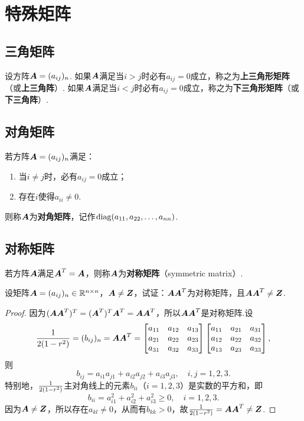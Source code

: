 \section{特殊矩阵}
\subsection{三角矩阵}
\begin{definition}
设方阵\(\boldsymbol{A}=(a_{ij})_n\).
如果\(\boldsymbol{A}\)满足当\(i>j\)时必有\(a_{ij} = 0\)成立，称之为\textbf{上三角形矩阵}（或\textbf{上三角阵}）.
如果\(\boldsymbol{A}\)满足当\(i<j\)时必有\(a_{ij} = 0\)成立，称之为\textbf{下三角形矩阵}（或\textbf{下三角阵}）.
\end{definition}

\subsection{对角矩阵}
\begin{definition}
若方阵\(\boldsymbol{A}=(a_{ij})_n\)满足：
\begin{enumerate}
\item 当\(i \neq j\)时，必有\(a_{ij} = 0\)成立；
\item 存在\(i\)使得\(a_{ii} \neq 0\).
\end{enumerate}
则称\(\boldsymbol{A}\)为\textbf{对角矩阵}，记作\(\operatorname{diag}(a_{11},a_{22},\dotsc,a_{nn})\).
\end{definition}

\subsection{对称矩阵}
\begin{definition}
若方阵\(\boldsymbol{A}\)满足\(\boldsymbol{A}^T = \boldsymbol{A}\)，则称\(\boldsymbol{A}\)为\textbf{对称矩阵}（symmetric matrix）.
\end{definition}

\begin{example}
设矩阵\(\boldsymbol{A} = (a_{ij})_n \in \mathbb{R}^{n \times n}\)，\(\boldsymbol{A} \neq \boldsymbol{Z}\)，试证：\(\boldsymbol{A} \boldsymbol{A}^T\)为对称矩阵，且\(\boldsymbol{A} \boldsymbol{A}^T \neq \boldsymbol{Z}\).
\begin{proof}
因为\((\boldsymbol{A} \boldsymbol{A}^T)^T = (\boldsymbol{A}^T)^T \boldsymbol{A}^T = \boldsymbol{A} \boldsymbol{A}^T\)，所以\(\boldsymbol{A} \boldsymbol{A}^T\)是对称矩阵.设\[
\frac{1}{2(1-r^2)} = (b_{ij})_n = \boldsymbol{A} \boldsymbol{A}^T = \begin{bmatrix}
a_{11} & a_{12} & a_{13} \\
a_{21} & a_{22} & a_{23} \\
a_{31} & a_{32} & a_{33} \\
\end{bmatrix} \begin{bmatrix}
a_{11} & a_{21} & a_{31} \\
a_{12} & a_{22} & a_{32} \\
a_{13} & a_{23} & a_{33} \\
\end{bmatrix},
\]则\[
b_{ij} = a_{i1} a_{j1} + a_{i2} a_{j2} + a_{i3} a_{j3},
\quad i,j=1,2,3.
\]特别地，\(\frac{1}{2(1-r^2)}\)主对角线上的元素\(b_{ii}\)（\(i=1,2,3\)）是实数的平方和，即\[
b_{ii} = a_{i1}^2 + a_{i2}^2 + a_{i3}^2 \geqslant 0,
\quad i=1,2,3.
\]因为\(\boldsymbol{A} \neq \boldsymbol{Z}\)，所以存在\(a_{kl} \neq 0\)，从而有\(b_{kk} > 0\)，故\(\frac{1}{2(1-r^2)} = \boldsymbol{A} \boldsymbol{A}^T \neq \boldsymbol{Z}\).
\end{proof}
\end{example}

